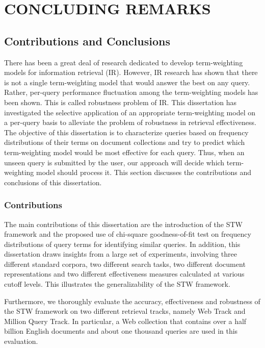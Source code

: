 


\chapter{\textbf{CONCLUDING REMARKS}}
\label{ch9}

\section{Contributions and Conclusions}

There has been a great deal of research dedicated to develop term-weighting models for information retrieval (IR). 
However, IR research has shown that there is not a single term-weighting model that would answer the best on any query.
Rather, per-query performance fluctuation among the term-weighting models has been shown.
This is called robustness problem of IR.
This dissertation has investigated the selective application of an appropriate term-weighting model on a per-query basis to alleviate the problem of robustness in retrieval effectiveness.
The objective of this dissertation is to characterize queries based on frequency distributions of their terms on document collections and try to predict which term-weighting model would be most effective for each query.
Thus, when an unseen query is submitted by the user, our approach will decide which term-weighting model should process it.
This section discusses the contributions and conclusions of this dissertation.

\subsection{Contributions}
The main contributions of this dissertation are the introduction of the STW framework and the proposed use of chi-square goodness-of-fit test  
on frequency distributions of query terms for identifying similar queries.
In addition, this dissertation draws insights from a large set of experiments, involving three different standard corpora, two different search tasks, two different document representations and two different effectiveness measures calculated at various cutoff levels.
This illustrates the generalizability of the STW framework.

Furthermore, we thoroughly evaluate the accuracy, effectiveness and robustness of the STW framework on two different retrieval tracks, namely Web Track and Million Query Track.
In particular, a Web collection that contains over a half billion English documents and about one thousand queries are used in this evaluation.

